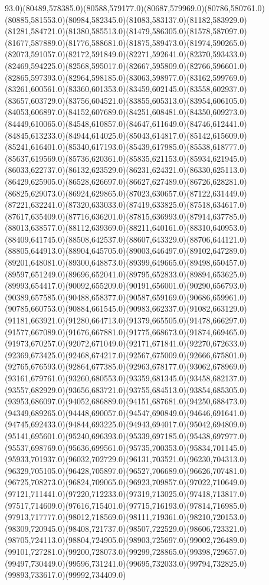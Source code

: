 \documentclass[conference]{IEEEtran}
\begin{document}
93.0)(80489,578385.0)(80588,579177.0)(80687,579969.0)(80786,580761.0)(80885,581553.0)(80984,582345.0)(81083,583137.0)(81182,583929.0)(81281,584721.0)(81380,585513.0)(81479,586305.0)(81578,587097.0)(81677,587889.0)(81776,588681.0)(81875,589473.0)(81974,590265.0)(82073,591057.0)(82172,591849.0)(82271,592641.0)(82370,593433.0)(82469,594225.0)(82568,595017.0)(82667,595809.0)(82766,596601.0)(82865,597393.0)(82964,598185.0)(83063,598977.0)(83162,599769.0)(83261,600561.0)(83360,601353.0)(83459,602145.0)(83558,602937.0)(83657,603729.0)(83756,604521.0)(83855,605313.0)(83954,606105.0)(84053,606897.0)(84152,607689.0)(84251,608481.0)(84350,609273.0)(84449,610065.0)(84548,610857.0)(84647,611649.0)(84746,612441.0)(84845,613233.0)(84944,614025.0)(85043,614817.0)(85142,615609.0)(85241,616401.0)(85340,617193.0)(85439,617985.0)(85538,618777.0)(85637,619569.0)(85736,620361.0)(85835,621153.0)(85934,621945.0)(86033,622737.0)(86132,623529.0)(86231,624321.0)(86330,625113.0)(86429,625905.0)(86528,626697.0)(86627,627489.0)(86726,628281.0)(86825,629073.0)(86924,629865.0)(87023,630657.0)(87122,631449.0)(87221,632241.0)(87320,633033.0)(87419,633825.0)(87518,634617.0)(87617,635409.0)(87716,636201.0)(87815,636993.0)(87914,637785.0)(88013,638577.0)(88112,639369.0)(88211,640161.0)(88310,640953.0)(88409,641745.0)(88508,642537.0)(88607,643329.0)(88706,644121.0)(88805,644913.0)(88904,645705.0)(89003,646497.0)(89102,647289.0)(89201,648081.0)(89300,648873.0)(89399,649665.0)(89498,650457.0)(89597,651249.0)(89696,652041.0)(89795,652833.0)(89894,653625.0)(89993,654417.0)(90092,655209.0)(90191,656001.0)(90290,656793.0)(90389,657585.0)(90488,658377.0)(90587,659169.0)(90686,659961.0)(90785,660753.0)(90884,661545.0)(90983,662337.0)(91082,663129.0)(91181,663921.0)(91280,664713.0)(91379,665505.0)(91478,666297.0)(91577,667089.0)(91676,667881.0)(91775,668673.0)(91874,669465.0)(91973,670257.0)(92072,671049.0)(92171,671841.0)(92270,672633.0)(92369,673425.0)(92468,674217.0)(92567,675009.0)(92666,675801.0)(92765,676593.0)(92864,677385.0)(92963,678177.0)(93062,678969.0)(93161,679761.0)(93260,680553.0)(93359,681345.0)(93458,682137.0)(93557,682929.0)(93656,683721.0)(93755,684513.0)(93854,685305.0)(93953,686097.0)(94052,686889.0)(94151,687681.0)(94250,688473.0)(94349,689265.0)(94448,690057.0)(94547,690849.0)(94646,691641.0)(94745,692433.0)(94844,693225.0)(94943,694017.0)(95042,694809.0)(95141,695601.0)(95240,696393.0)(95339,697185.0)(95438,697977.0)(95537,698769.0)(95636,699561.0)(95735,700353.0)(95834,701145.0)(95933,701937.0)(96032,702729.0)(96131,703521.0)(96230,704313.0)(96329,705105.0)(96428,705897.0)(96527,706689.0)(96626,707481.0)(96725,708273.0)(96824,709065.0)(96923,709857.0)(97022,710649.0)(97121,711441.0)(97220,712233.0)(97319,713025.0)(97418,713817.0)(97517,714609.0)(97616,715401.0)(97715,716193.0)(97814,716985.0)(97913,717777.0)(98012,718569.0)(98111,719361.0)(98210,720153.0)(98309,720945.0)(98408,721737.0)(98507,722529.0)(98606,723321.0)(98705,724113.0)(98804,724905.0)(98903,725697.0)(99002,726489.0)(99101,727281.0)(99200,728073.0)(99299,728865.0)(99398,729657.0)(99497,730449.0)(99596,731241.0)(99695,732033.0)(99794,732825.0)(99893,733617.0)(99992,734409.0)
\end{document}
